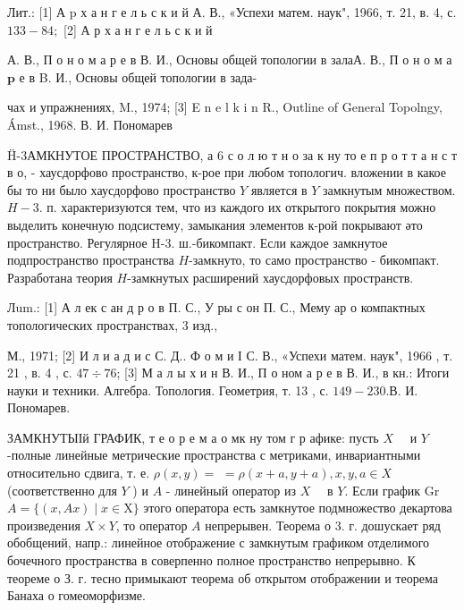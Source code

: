 \documentclass[10pt]{article}
\begin{document}
Лит.: [1] А p х а н г е л ь с к и й А. В., «Успехи матем. наук", 1966, т. 21, в. 4, с. $133-84 ;$ [2] А р х а н г е л ь с к и й

А. В., П о н о м а р е в В. И., Основы общей топологии в залаА. В., П о н о м а $\mathbf{p}$ е в B. И., Основы общей топологии в зада-

чах и упражнениях, M., 1974; [3] E n e l k i n R., Outline of General Topolngy, Ámst., 1968. В. И. Пономарев



Ḧ-3АМКНУТОЕ ПРОСТРАНСТВО, а 6 с о л ю т н о за к ну то е п р о т т а н с т в о, - хаусдорфово пространство, к-рое при любом топологич. вложении в какое бы то ни было хаусдорфово пространство $Y$ является в $Y$ замкнутым множеством. $H-3$. п. характеризуются тем, что из каждого их открытого покрытия можно выделить конечную подсистему, замыкания элементов к-рой покрывают әто пространство. Регулярное H-3. ш.-бикомпакт. Если каждое замкнутое подпространство пространства $H$-замкнуто, то само пространство - бикомпакт. Разработана теория $H$-замкнутых расширений хаусдорфовых пространств.



Лum.: [1] А л ек с ан д р о в П. С., У ры с он П. С., Мему ар о компактных топологических пространствах, 3 изд.,

М., 1971; [2] И л и а д и с С. Д.. Ф о м и І С. В., «Успехи матем. наук", 1966 , т. 21 , в. 4 , с. $47 \div 76$; [3] М а л ы х и н В. И., П о ном а р е в В. И., в кн.: Итоги науки и техники. Алгебра. Топология. Геометрия, т. 13 , с. $149-230$.В. И. Пономарев.



ЗАМКНУТЫІй ГРАФИК, т е о р е м а о мк ну том г р афике: пусть $X \quad$ и $Y$-полные линейные метрические пространства с метриками, инвариантными относительно сдвига, т. е. $\rho(x, y)=$ $=\rho(x+a, y+a), x, y, a \in X$ (соответственно для $Y$ ) и $A$ - линейный оператор из $X \quad$ в $Y$. Если график Gr $A=\{(x, A x) \mid x \in \mathrm{X}\}$ этого оператора есть замкнутое подмножество декартова произведения $X \times Y$, то оператор $A$ непрерывен. Теорема о 3. г. дошускает ряд обобщений, напр.: линейное отображение с замкнутым графиком отделимого бочечного пространства в соверпенно полное пространство непрерывно. К теореме о З. г. тесно примыкают теорема об открытом отображении и теорема Банаха о гомеоморфизме.
\end{document}
